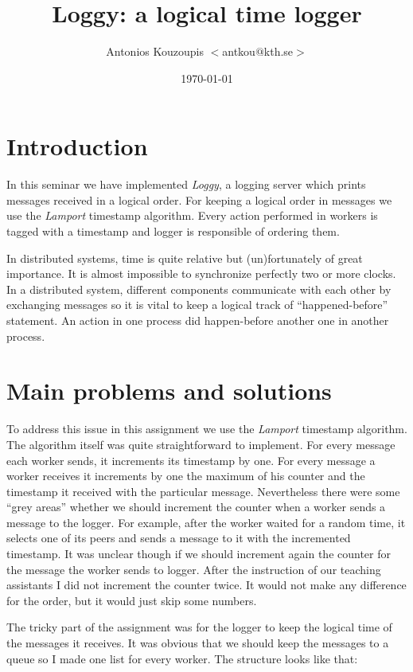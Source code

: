 \documentclass[a4paper, 11pt]{article}
\title{Loggy: a logical time logger}
\author{Antonios Kouzoupis $<$antkou$@$kth.se$>$}
\date{\today{}}
\begin{document}
\maketitle

\section{Introduction}

In this seminar we have implemented \emph{Loggy}, a logging server which prints
messages received in a logical order. For keeping a logical order in messages we
use the \emph{Lamport} timestamp algorithm. Every action performed in workers is
tagged with a timestamp and logger is responsible of ordering them.

In distributed systems, time is quite relative but (un)fortunately of great
importance. It is almost impossible to synchronize perfectly two or more clocks.
In a distributed system, different components communicate with each other by
exchanging messages so it is vital to keep a logical track of
``happened-before'' statement. An action in one process did happen-before
another one in another process.

\section{Main problems and solutions}

To address this issue in this assignment we use the \emph{Lamport} timestamp
algorithm. The algorithm itself was quite straightforward to implement. For
every message each worker sends, it increments its timestamp by one. For every
message a worker receives it increments by one the maximum of his counter and the
timestamp it received with the particular message. Nevertheless there were some
``grey areas'' whether we should increment the counter when a worker sends a
message to the logger. For example, after the worker waited for a random time,
it selects one of its peers and sends a message to it with the incremented
timestamp. It was unclear though if we should increment again the counter for
the message the worker sends to logger. After the instruction of our teaching
assistants I did not increment the counter twice. It would not make any
difference for the order, but it would just skip some numbers.

The tricky part of the assignment was for the logger to keep the logical time of
the messages it receives. It was obvious that we should keep the messages to a
queue so I made one list for every worker. The structure looks like that:
\end{document}
